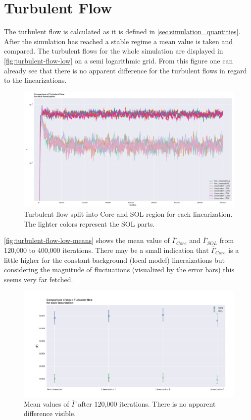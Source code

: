 \documentclass[master.tex]{subfiles}
\newcommand{\Tflow}[0]{\overline{\Gamma}}
\begin{document}
\section{Turbulent Flow}
The turbulent flow is calculated as it is defined in \autoref{sec:simulation_quantities}. After the simulation has reached a stable regime a mean value is taken and compared. The turbulent flows for the whole simulation are displayed in \autoref{fig:turbulent-flow-low} on a semi logarithmic grid. From this figure one can already see that there is no apparent difference for the turbulent flows in regard to the linearizations.
\begin{figure}[!htbp]
    \includegraphics[width=\linewidth]{pdfs/turbulent-flow-low.pdf}
    \caption{Turbulent flow split into Core and \ac{SOL} region for each linearization. The lighter colors represent the \ac{SOL} parts.}
    \label{fig:turbulent-flow-low}
\end{figure}
\autoref{fig:turbulent-flow-low-means} shows the mean value of $\Tflow_{Core}$ and $\Tflow_{SOL}$ from 120,000 to 400,000 iterations. There may be a small indication that $\Tflow_{Core}$ is a little higher for the constant background (local model) lineraizations but considering the magnitude of fluctuations (visualized by the error bars) this seems very far fetched. 



\begin{figure}[!htbp]
    \includegraphics[width=\linewidth]{pdfs/turbulent-flow-low-means.pdf}
    \caption{Mean values of $\Tflow$ after 120,000 iterations. There is no apparent difference visible.}
    \label{fig:turbulent-flow-low-means}
\end{figure}
\end{document}
